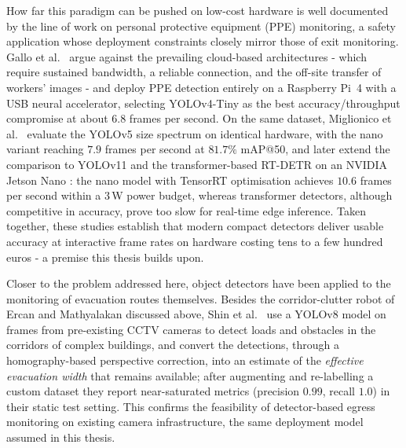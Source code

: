 How far this paradigm can be pushed on low-cost hardware is well documented by
the line of work on personal protective equipment (PPE) monitoring, a safety
application whose deployment constraints closely mirror those of exit
monitoring. Gallo et al.~\cite{Gallo2022} argue against the prevailing
cloud-based architectures - which require sustained bandwidth, a reliable
connection, and the off-site transfer of workers' images - and deploy
PPE detection entirely on a Raspberry Pi~4 with a USB neural accelerator,
selecting YOLOv4-Tiny as the best accuracy/throughput compromise at about
$6.8$ frames per second. On the same dataset, Miglionico et
al.~\cite{Miglionico2024} evaluate the YOLOv5 size spectrum on identical
hardware, with the nano variant reaching $7.9$ frames per second at
$81.7\%$ mAP@50, and later extend the comparison to YOLOv11 and the
transformer-based RT-DETR on an NVIDIA Jetson Nano \cite{Miglionico2025}: the
nano model with TensorRT optimisation achieves $10.6$ frames per second within
a $3$\,W power budget, whereas transformer detectors, although competitive in
accuracy, prove too slow for real-time edge inference. Taken together, these
studies establish that modern compact detectors deliver usable accuracy at
interactive frame rates on hardware costing tens to a few hundred euros - a
premise this thesis builds upon.

Closer to the problem addressed here, object detectors have been applied to the
monitoring of evacuation routes themselves. Besides the corridor-clutter robot
of Ercan and Mathyalakan \cite{Ercan2024} discussed above, Shin et
al.~\cite{Shin2025} use a YOLOv8 model on frames from pre-existing CCTV
cameras to detect loads and obstacles in the corridors of complex buildings,
and convert the detections, through a homography-based perspective correction,
into an estimate of the \emph{effective evacuation width} that remains
available; after augmenting and re-labelling a custom dataset they report
near-saturated metrics (precision $0.99$, recall $1.0$) in their static test
setting. This confirms the feasibility of detector-based egress monitoring on
existing camera infrastructure, the same deployment model assumed in this
thesis.

